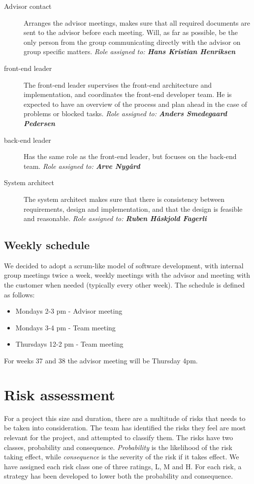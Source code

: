 \documentclass[11pt,a4paper,titlepage,oneside]{report}
\begin{document}
\begin{description}
\item[Advisor contact] Arranges the advisor meetings, makes sure that all required documents are sent to the advisor before each meeting. Will, as far as possible, be the only person from the group communicating directly with the advisor on group specific matters.
\emph{Role assigned to: \textbf{Hans Kristian Henriksen}}

\item[\Gls{front-end} leader] The \gls{front-end} leader supervises the \gls{front-end} architecture and implementation, and coordinates the \gls{front-end} developer team. He is expected to have an overview of the process and plan ahead in the case of problems or blocked tasks.
\emph{Role assigned to: \textbf{Anders Smedegaard Pedersen}}

\item[\Gls{back-end} leader] Has the same role as the \gls{front-end} leader, but focuses on the \gls{back-end} team.
\emph{Role assigned to: \textbf{Arve Nygård}}

\item[System architect] The system architect makes sure that there is consistency between requirements, design and implementation, and that the design is feasible and reasonable.
\emph{Role assigned to: \textbf{Ruben Håskjold Fagerli}}
\end{description}

\subsection{Weekly schedule}
We decided to adopt a scrum-like model of software development, with internal group meetings twice a week, weekly meetings with the advisor and meeting with the customer when needed (typically every other week). The schedule is defined as follows:
\begin{itemize}
\item Mondays 2-3 pm - Advisor meeting
\item Mondays 3-4 pm - Team meeting
\item Thursdays 12-2 pm - Team meeting
\end{itemize}
For weeks 37 and 38 the advisor meeting will be Thursday 4pm.

\section{Risk assessment}
For a project this size and duration, there are a multitude of risks that needs to be taken into consideration. The team has identified the risks they feel are most relevant for the project, and attempted to classify them. The risks have two classes, probability and consequence. \textit{Probability} is the likelihood of the risk taking effect, while \textit{consequence} is the severity of the risk if it takes effect. We have assigned each risk class one of three ratings, \gls{L}, \gls{M} and \gls{H}. For each risk, a strategy has been developed to lower both the probability and consequence. 
\end{document}
